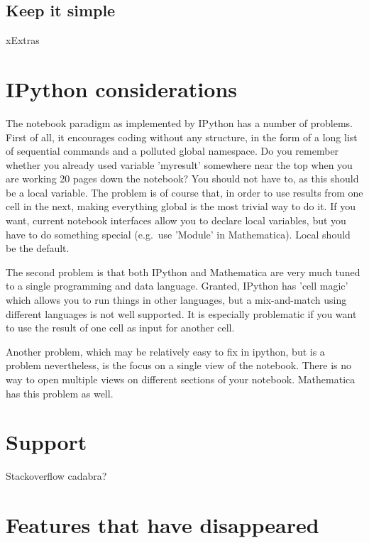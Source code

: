 \documentclass[11pt]{article}
\begin{document}
\subsection{Keep it simple}


xExtras

\section{IPython considerations}

The notebook paradigm as implemented by IPython has a number of
problems. First of all, it encourages coding without any structure, in
the form of a long list of sequential commands and a polluted global
namespace. Do you remember whether you already used variable
'myresult' somewhere near the top when you are working 20 pages down
the notebook? You should not have to, as this should be a local
variable. The problem is of course that, in order to use results from
one cell in the next, making everything global is the most trivial way
to do it. If you want, current notebook interfaces allow you to
declare local variables, but you have to do something special
(e.g.~use 'Module' in Mathematica). Local should be the default.

The second problem is that both IPython and Mathematica are very much
tuned to a single programming and data language. Granted, IPython has
'cell magic' which allows you to run things in other languages, but a
mix-and-match using different languages is not well supported. It is
especially problematic if you want to use the result of one cell as
input for another cell.

Another problem, which may be relatively easy to fix in ipython, but
is a problem nevertheless, is the focus on a single view of the
notebook. There is no way to open multiple views on different sections
of your notebook. Mathematica has this problem as well.


\section{Support}

Stackoverflow cadabra?

\section{Features that have disappeared}
\end{document}
